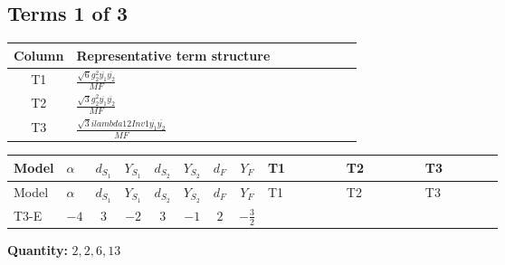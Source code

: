 \documentclass[8pt]{article}
\begin{document}
\begin{landscape}
\subsection*{Terms 1 of 3}
\begin{center}
\begin{tabular}{@{}c >{\raggedright\arraybackslash}p{0.82\linewidth}@{}}
\toprule
Column & Representative term structure \\
\midrule
T1 & \(\displaystyle \frac{\sqrt{6} g_{2}^{2} \overline{y_{1}} \overline{y_{2}}}{MF}\) \\
\midrule
T2 & \(\displaystyle \frac{\sqrt{3} g_{2}^{2} \overline{y_{1}} \overline{y_{2}}}{MF}\) \\
\midrule
T3 & \(\displaystyle \frac{\sqrt{3} i lambda12Inv1 \overline{y_{1}} \overline{y_{2}}}{MF}\) \\
\midrule
\bottomrule
\end{tabular}
\end{center}
\smallskip
\tiny
\begin{longtable}{@{}llcccccc >{\raggedright\arraybackslash}p{0.21\linewidth} >{\raggedright\arraybackslash}p{0.21\linewidth} >{\raggedright\arraybackslash}p{0.21\linewidth}@{}}
\toprule
Model & $\alpha$ & $d_{S_1}$ & $Y_{S_1}$ & $d_{S_2}$ & $Y_{S_2}$ & $d_F$ & $Y_F$ & T1 & T2 & T3 \\
\midrule
\endfirsthead
\toprule
Model & $\alpha$ & $d_{S_1}$ & $Y_{S_1}$ & $d_{S_2}$ & $Y_{S_2}$ & $d_F$ & $Y_F$ & T1 & T2 & T3 \\
\midrule
\endhead
T3-E & $-4$ & $3$ & $-2$ & $3$ & $-1$ & $2$ & $-\frac{3}{2}$ & \scriptsize\adjustbox{max width=\linewidth}{$\begin{gathered} \frac{\sqrt{6} g_{2}^{2} \overline{y_{1}} \overline{y_{2}}}{3 MF}\end{gathered}$} & \scriptsize\adjustbox{max width=\linewidth}{$\begin{gathered} \frac{\sqrt{3} g_{2}^{2} \overline{y_{1}} \overline{y_{2}}}{6 MF}\end{gathered}$} & \scriptsize\adjustbox{max width=\linewidth}{$\begin{gathered} - \frac{\sqrt{3} i lambda12Inv1 \overline{y_{1}} \overline{y_{2}}}{6 MF}\end{gathered}$} \\
\midrule
\bottomrule
\end{longtable}
\clearpage
\noindent\textbf{Quantity: }$\mathrm{2,2,6,13}$\par\smallskip

\end{landscape}
\end{document}

